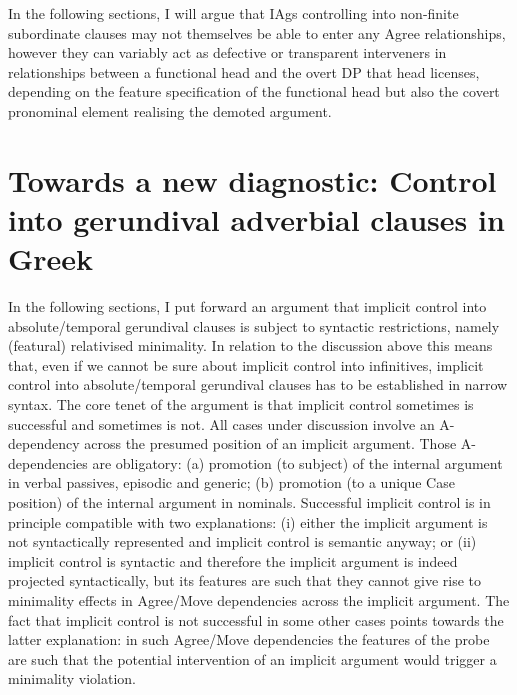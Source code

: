 \documentclass[output=paper]{langsci/langscibook}
\begin{document}
In the following sections, I will argue that \glspl{IAg} controlling into non-finite
subordinate clauses may not themselves be able to enter any Agree
relationships, however they can variably act as defective or transparent
interveners in  relationships between a functional head and the overt DP
that head licenses, depending on the feature specification of the functional
head but also the covert pronominal element realising the demoted argument.

\section{Towards a new diagnostic: Control into gerundival adverbial clauses in
Greek}\label{sec:22.3}

In the following sections, I put forward an argument that implicit control into
absolute/temporal gerundival clauses is subject to syntactic restrictions,
namely (featural) relativised minimality. In relation to the discussion above
this means that, even if we cannot be sure about implicit control into
infinitives, implicit control into absolute/temporal gerundival clauses has to
be established in narrow syntax. The core tenet of the argument is that
implicit control sometimes is successful and sometimes is not. All cases under
discussion involve an A-dependency across the presumed position of an implicit
argument. Those A-dependencies are obligatory: (a) promotion (to subject) of
the internal argument in verbal passives, episodic and generic; (b) promotion
(to a unique Case position) of the internal argument in  nominals.
Successful implicit control is in principle compatible with two explanations:
(i) either the implicit argument is not syntactically represented and implicit
control is semantic anyway; or (ii) implicit control is syntactic and therefore
the implicit argument is indeed projected syntactically, but its features are
such that they cannot give rise to minimality effects in Agree/Move
dependencies across the implicit argument. The fact that implicit control
is not successful in some other cases points towards the latter explanation: in
such Agree/Move dependencies the features of the probe are such that the
potential intervention of an implicit argument would trigger a minimality
violation.
\end{document}
